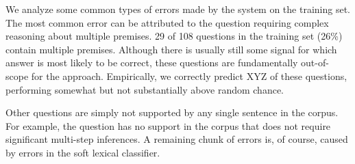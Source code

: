 We analyze some common types of errors made by the system on the training set.
The most common error can be attributed to the question requiring complex reasoning
  about multiple premises.
\num{29} of \num{108} questions in the training set (26\%) contain multiple
  premises.
Although there is usually still some signal for which answer is most likely to be correct,
  these questions are fundamentally out-of-scope for the approach.
Empirically, we correctly predict \num{XYZ} of these questions, performing somewhat 
  but not substantially above random chance.

Other questions are simply not supported by any single sentence in the corpus.
For example, the question  has
  no support in the corpus that does not require significant multi-step inferences.
A remaining chunk of errors is, of course, caused by errors in the soft lexical classifier.
